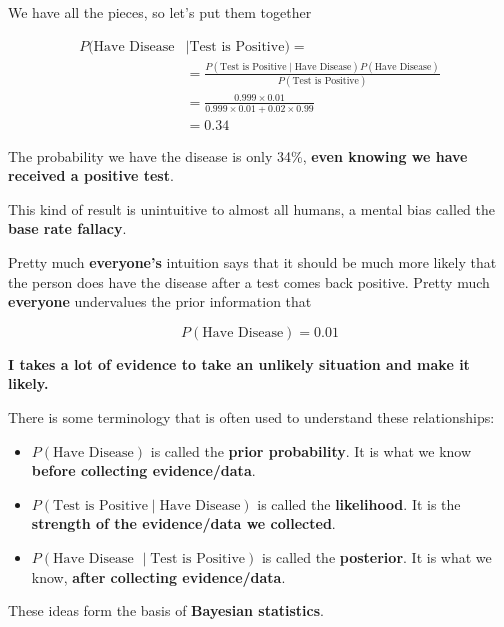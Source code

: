 \begin{frame}

We have all the pieces, so let's put them together

\begin{align*}
P(\text{Have Disease}  & \mid \text{Test is Positive}) = \\
%
&= \frac{  P(\text{Test is
Positive} \mid \text{Have Disease}) P(\text{Have Disease}) } { P(\text{Test is
Positive}) } \\
%
&= \frac{ 0.999 \times 0.01 } {  0.999 \times 0.01 +  0.02 \times 0.99 } \\
%
&= 0.34
\end{align*}

The probability we have the disease is only 34\%, \textbf{even knowing we
have received a positive test}.

\end{frame}
%

%
\begin{frame}

This kind of result is unintuitive to almost all humans, a mental bias called the
\textbf{base rate fallacy}.

\end{frame}
%

%
\begin{frame}

Pretty much \textbf{everyone's} intuition says that it should be much more
likely that the person does have the disease after a test comes back positive.
Pretty much \textbf{everyone} undervalues the prior information that

$$ P(\text{Have Disease}) = 0.01 $$

\textbf{I takes a lot of evidence to take an unlikely situation and make it
likely.}

\end{frame}
%

%
\begin{frame}
There is some terminology that is often used to understand these relationships:

\begin{itemize}
\item $P(\text{Have Disease})$ is called the \textbf{prior probability}.  It is
what we know \textbf{before collecting evidence/data}.
\item $P(\text{Test is Positive} \mid \text{Have Disease})$ is called the
\textbf{likelihood}.  It is the \textbf{strength of the evidence/data we collected}.
\item $P(\text{Have Disease } \mid \text{Test is Positive})$ is called the
\textbf{posterior}.  It is what we know, \textbf{after collecting evidence/data}.
\end{itemize}

These ideas form the basis of \textbf{Bayesian statistics}.

\end{frame}
%

